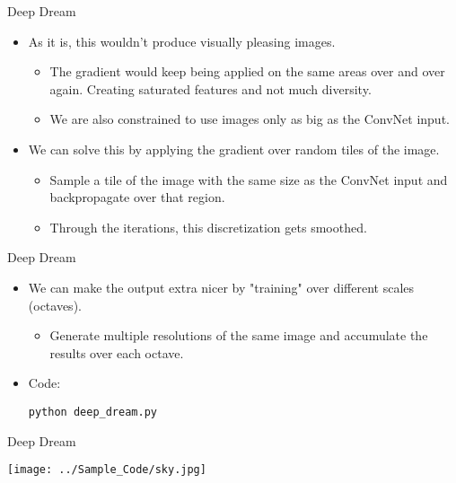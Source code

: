 \begin{frame}{Deep Dream}
	\begin{itemize}
		\item As it is, this wouldn't produce visually pleasing images.
		\begin{itemize}
			\item The gradient would keep being applied on the same areas over and over again. Creating saturated features and not much diversity.
			\item We are also constrained to use images only as big as the ConvNet input.
		\end{itemize}
		\item We can solve this by applying the gradient over random tiles of the image.
		\begin{itemize}
			\item Sample a tile of the image with the same size as the ConvNet input and backpropagate over that region.
			\item Through the iterations, this discretization gets smoothed.
		\end{itemize}
	\end{itemize}
\end{frame}

\begin{frame}{Deep Dream}
	\begin{itemize}
		\item We can make the output extra nicer by "training" over different scales (octaves).
		\begin{itemize}
			\item Generate multiple resolutions of the same image and accumulate the results over each octave.
		\end{itemize}
		\item<2-> Code:
		\begin{center}
			{\smaller \texttt{python deep\_dream.py}}
		\end{center}
	\end{itemize}
\end{frame}

\begin{frame}{Deep Dream}
	\begin{center}
		\texttt{[image: ../Sample\_Code/sky.jpg]}
	\end{center}
\end{frame}

